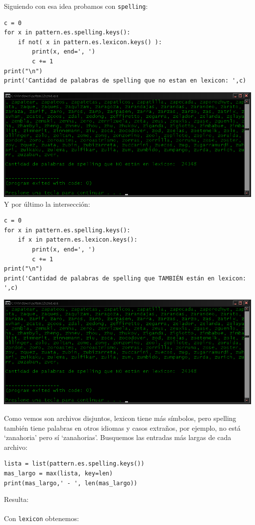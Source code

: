 Siguiendo con esa idea probamos con \texttt{spelling}:
\begin{verbatim}
c = 0
for x in pattern.es.spelling.keys():
	if not( x in pattern.es.lexicon.keys() ):
		print(x, end=', ')
		c += 1
print("\n")
print('Cantidad de palabras de spelling que no estan en lexicon: ',c)
\end{verbatim}
\includegraphics[width=\textwidth,keepaspectratio]{img/spenlex.png}
Y por último la intersección:
\begin{verbatim}
c = 0
for x in pattern.es.spelling.keys():
	if x in pattern.es.lexicon.keys():
		print(x, end=', ')
		c += 1
print("\n")
print('Cantidad de palabras de spelling que TAMBIÉN están en lexicon: ',c)
\end{verbatim}

\includegraphics[width=\textwidth,height=0.8\textheight,keepaspectratio]{img/spenlex.png}

Como vemos son archivos disjuntos, lexicon tiene más símbolos,
pero spelling también tiene palabras en otros idiomas y casos extraños,
por ejemplo, no está `zanahoria' pero sí `zanahorias'.
Busquemos las entradas más largas de cada archivo:

\begin{verbatim}
lista = list(pattern.es.spelling.keys())
mas_largo = max(lista, key=len)
print(mas_largo,' - ', len(mas_largo))
\end{verbatim}
Resulta:
\\
\\Con \texttt{lexicon} obtenemos:
\\

